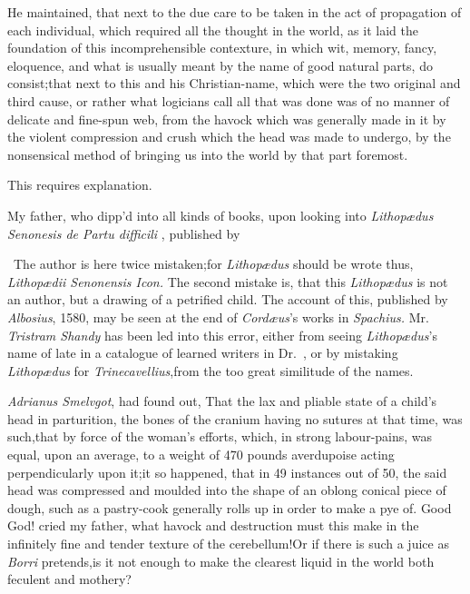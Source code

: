 \documentclass{article}
\begin{document}
He maintained, that next to the due care to be taken in the act
of propagation of each individual, which required all the thought
in the world, as it laid the foundation of this incomprehensible
contexture, in which wit, memory, fancy, eloquence, and what is
usually meant by the name of good natural parts, do
consist;\tsk that next to this and his Christian-name, which were
the two original and
third cause, or rather what logicians
call 
all that was done was of no manner of 
delicate and fine-spun web, from the ha\-vock
which was generally made in it by
the violent compression and crush
which the head was made to undergo, by the nonsensical method of
bringing us into the world by that part foremost.

\tsh This requires explanation.

My father, who dipp’d into all kinds of books, upon looking into \textit{Lithopædus
Senonesis de Partu difficili} \fnast, published by\break
{}

\vfill

\bgroup\fontsize{8}{11}\selectfont\quad\fnast\ 
The author is here twice mistaken;\tsh for \textit{Lithopædus} should be wrote thus,
\textit{Lithopædii Seno\-nensis Icon.} The second mistake is, that this
\textit{Li\-thopædus} is not an author, but a drawing of a petrified child. The
account of this, published by \textit{Albosius}, 1580, may be seen at the end of
\textit{Cordæus}’s works in \textit{Spachius.} Mr.  \textit{Tristram Shandy} has
been led into this error, either from seeing \textit{Lithopædus}’s name of late in a
catalogue of learned writers in \hbox{Dr. \tsh}, or by mistaking \textit{Lithopædus}
for \textit{Trine\-ca\-vellius},\tsk from the too great similitude of the names.\par\egroup

\newpage\noindent
\textit{Adrianus Smelvgot}, had found out, That\break
the lax and pliable state of a child’s\break
head in parturition, the bones of the\break
cranium having no sutures at that time,\break
was such,\tsk that by force of the woman’s\break
efforts, which, in strong labour-pains,\break
was equal, upon an average, to a
weight of 470 pounds averdupoise acting perpendicularly upon it;\tsk it so happened,
that in 49 instances out of 50, the said head was compressed and moulded into the
shape of an oblong conical piece of dough, such as a pastry-cook generally rolls up
in order to make a pye of.\tsh\break
Good God!  cried my father, what ha\-vock and destruction
must this make in the infinitely fine and tender texture of the cerebellum!\tsk Or if
there is such a juice as \textit{Borri} pretends,\tsk is it not enough to make the
clearest liquid in the world both feculent and
mothery?
\end{document}
